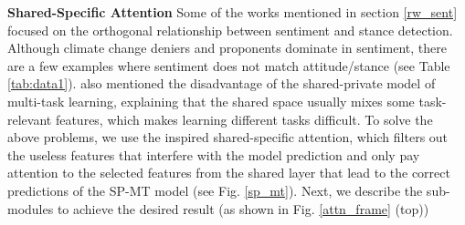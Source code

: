 \documentclass[letterpaper]{article}
\begin{document}
\par \noindent \textbf{Shared-Specific Attention}\label{sharedattn_section} Some of the works mentioned in section \ref{rw_sent} focused on the orthogonal relationship between sentiment and stance detection. Although climate change deniers and proponents dominate in sentiment, there are a few examples where sentiment does not match attitude/stance (see Table \ref{tab:data1}). \cite{wu2019different} also mentioned the disadvantage of the shared-private model of multi-task learning, explaining that the shared space usually mixes some task-relevant features, which makes learning different tasks difficult. %
To solve the above problems, we use the \cite{wu2019different} inspired shared-specific attention, which filters out the useless features that interfere with the model prediction and only pay attention to the selected features from the shared layer that lead to the correct predictions of the SP-MT model (see Fig. \ref{sp_mt}). Next, we describe the sub-modules to achieve the desired result (as shown in Fig. \ref{attn_frame} (top))
\end{document}
